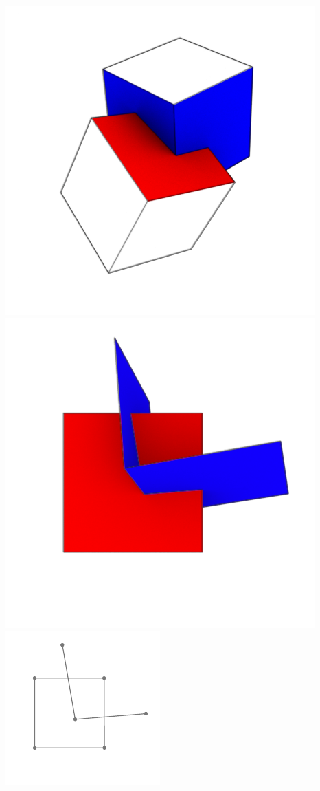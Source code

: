 \includegraphics{./img/ch1-3.png}\\
\includegraphics{./img/ch1-4.png}
\includegraphics{./img/ch1-5.pdf}
